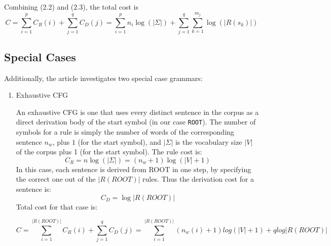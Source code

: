 \documentclass[paper=a4, fontsize=11pt]{scrartcl} %
\numberwithin{equation}{section} %
\numberwithin{figure}{section} %
\numberwithin{table}{section} %
\begin{document}
Combining (2.2) and (2.3), the total cost is
\begin{equation}\label{first}
C = \sum \limits_{i=1}^p C_R(i) + \sum\limits_{j=1}^q C_D(j) = \sum \limits_{i=1}^p n_i \log(\lvert \Sigma \rvert) + \sum\limits_{j=1}^q \sum\limits_{k=1}^{m_j} \log(\lvert R(s_k) \rvert)
\end{equation}

\subsection{Special Cases}
Additionally, the article investigates two special case grammars:
\begin{enumerate}[1.]
\item Exhaustive CFG

An exhaustive CFG is one that uses every distinct sentence in the corpus as a direct derivation body of the start symbol (in our case \texttt{ROOT}). The number of symbols for a rule is simply the number of words of the corresponding sentence \begin{math} n_w \end{math}, plus $1$ (for the start symbol), and \begin{math} \lvert \Sigma \rvert \end{math} is the vocabulary size \begin{math} \lvert V \rvert \end{math} of the corpus plus 1 (for the start symbol). The rule cost is:
\begin{equation}\label{first}
C_R = n \log(\lvert \Sigma \rvert) = (n_w + 1) \log(\lvert V \rvert + 1)
\end{equation}
In this case, each sentence is derived from ROOT in one step, by specifying the correct one out of the \begin{math} \lvert R(ROOT) \rvert \end{math} rules. Thus the derivation cost for a sentence is:
\begin{equation}\label{first}
C_D = \log \lvert R(ROOT) \rvert
\end{equation}
 Total cost for that case is:

\begin{equation}\label{first}
C = \sum \limits_{i=1}^{\lvert R(ROOT) \rvert} C_R(i) + \sum \limits_{j=1}^q C_D(j) = \sum \limits_{i=1}^{\lvert R(ROOT) \rvert} (n_w(i) + 1) log(\lvert V \rvert + 1) + q log \lvert R(ROOT) \rvert
\end{equation}


\end{enumerate}
\end{document}

